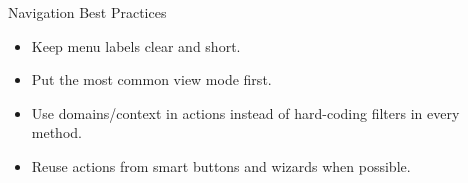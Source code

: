 \begin{frame}{Navigation Best Practices}
	\begin{itemize}
		\item Keep menu labels clear and short.
		\item Put the most common view mode first.
		\item Use domains/context in actions instead of hard-coding filters in every method.
		\item Reuse actions from smart buttons and wizards when possible.
	\end{itemize}
\end{frame}
